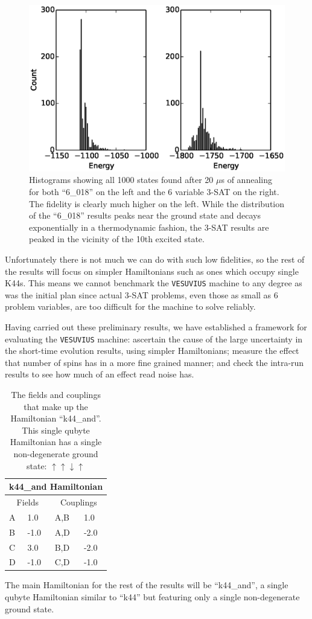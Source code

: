 \begin{figure}
	\includegraphics{img/hist.eps}
	\caption[20 $\mu$s Result State Histograms]{Histograms showing all 1000 states found after 20 $\mu$s of annealing for both ``6\_018'' on the left and the 6 variable 3-SAT on the right.  The fidelity is clearly much higher on the left.  While the distribution of the ``6\_018'' results peaks near the ground state and decays exponentially in a thermodynamic fashion, the 3-SAT results are peaked in the vicinity of the 10th excited state.}
	\label{fig:test_6_hist}
\end{figure}

Unfortunately there is not much we can do with such low fidelities, so the rest of the results will focus on simpler Hamiltonians such as ones which occupy single K44s.  This means we cannot benchmark the \texttt{VESUVIUS} machine to any degree as was the initial plan since actual 3-SAT problems, even those as small as 6 problem variables, are too difficult for the machine to solve reliably.

Having carried out these preliminary results, we have established a framework for evaluating the \texttt{VESUVIUS} machine: ascertain the cause of the large uncertainty in the short-time evolution results, using simpler Hamiltonians; measure the effect that number of spins has in a more fine grained manner; and check the intra-run results to see how much of an effect read noise has.
\begin{table}
	\begin{center}
\begin{tabular}{ | l | l | l | l |}
	\hline
	\multicolumn{4}{|c|}{k44\_and Hamiltonian} \\ \hline
	\multicolumn{2}{|c|}{Fields} & \multicolumn{2}{c|}{Couplings} \\ \hline
	A & 1.0 & A,B & 1.0 \\
	B & -1.0 & A,D & -2.0 \\
	C & 3.0 & B,D & -2.0 \\
	D & -1.0 & C,D & -1.0 \\ \hline
\end{tabular}
\end{center}
\caption[k44\_and Hamiltonian]{The fields and couplings that make up the Hamiltonian ``k44\_and''.  This single qubyte Hamiltonian has a single non-degenerate ground state: $\uparrow\uparrow\downarrow\uparrow$ }
\end{table}

The main Hamiltonian for the rest of the results will be ``k44\_and'', a single qubyte Hamiltonian similar to ``k44'' but featuring only a single non-degenerate ground state.

